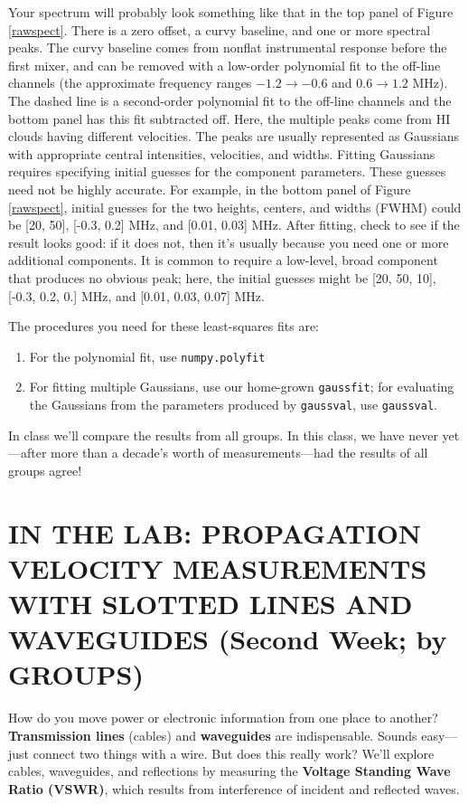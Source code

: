 \documentclass[11pt,preprint]{aastex}
\begin{document}
Your spectrum will probably look something like that in the top panel of
Figure \ref{rawspect}. There is a zero offset, a curvy baseline, and
one or more spectral peaks. The curvy baseline comes from nonflat
instrumental response before the first mixer, and can be removed with a
low-order polynomial fit to the off-line channels (the approximate
frequency ranges $-1.2 \rightarrow -0.6$ and $ 0.6 \rightarrow 1.2$
MHz). The dashed line is a second-order polynomial fit to the off-line
channels and the bottom panel has this fit subtracted off.  Here, the
multiple peaks come from HI clouds having different velocities. The
peaks are usually represented as Gaussians with appropriate central
intensities, velocities, and widths.  Fitting Gaussians requires
specifying initial guesses for the component parameters. These guesses
need not be highly accurate. For example, in the bottom panel of Figure
\ref{rawspect}, initial guesses for the two heights, centers, and widths
(FWHM) could be [20, 50], [-0.3, 0.2] MHz, and [0.01, 0.03] MHz.  After
fitting, check to see if the result looks good: if it does not, then
it's usually because you need one or more additional components. It is
common to require a low-level, broad component that produces no obvious
peak; here, the initial guesses might be [20, 50, 10], [-0.3, 0.2, 0.]
MHz, and [0.01, 0.03, 0.07] MHz. 

The procedures you need for these least-squares fits
are: \begin{enumerate}
\item For the polynomial fit, use {\tt numpy.polyfit}

\item For fitting multiple Gaussians, use our home-grown {\tt gaussfit}; for
  evaluating the Gaussians from the parameters produced by {\tt gaussval}, 
  use {\tt gaussval}.
\end{enumerate}

In class we'll compare the results from all groups. In this class, we
have never yet---after more than a decade's worth of measurements---had
the results of all groups agree!

\section {IN THE LAB: PROPAGATION VELOCITY MEASUREMENTS WITH SLOTTED LINES AND 
WAVEGUIDES (Second Week; by GROUPS)} \label{expt}

How do you move power or electronic information from one place to
another? {\bf Transmission lines} (cables) and {\bf waveguides} are
indispensable. Sounds easy---just connect two things with a wire. But
does this really work? We'll explore cables, waveguides, and reflections
by measuring the {\bf Voltage Standing Wave Ratio (VSWR)}, which results from
interference of incident and reflected waves.
\end{document}
